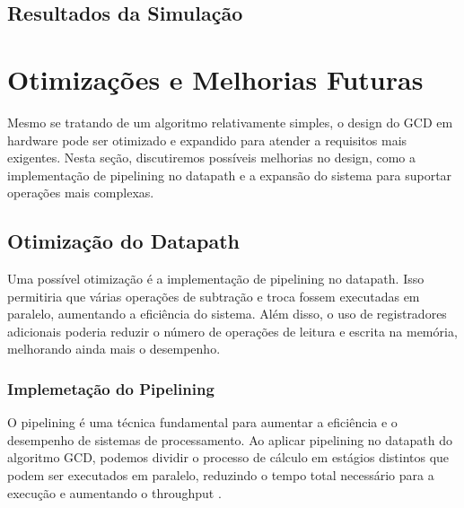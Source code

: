 \documentclass[a4paper,11pt]{article} %
\begin{document}
\subsection{Resultados da Simulação}

\section{Otimizações e Melhorias Futuras}

Mesmo se tratando de um algoritmo relativamente simples, o design do GCD em hardware pode ser otimizado e expandido para atender a requisitos mais exigentes. Nesta seção, discutiremos possíveis melhorias no design, como a implementação de pipelining no datapath e a expansão do sistema para suportar operações mais complexas.




\subsection{Otimização do Datapath}
Uma possível otimização é a implementação de pipelining no datapath. Isso permitiria que várias operações de subtração e troca fossem executadas em paralelo, aumentando a eficiência do sistema. Além disso, o uso de registradores adicionais poderia reduzir o número de operações de leitura e escrita na memória, melhorando ainda mais o desempenho.


\subsubsection{Implemetação do Pipelining}
O pipelining é uma técnica fundamental para aumentar a eficiência e o desempenho de sistemas de processamento. Ao aplicar pipelining no datapath do algoritmo GCD, podemos dividir o processo de cálculo em estágios distintos que podem ser executados em paralelo, reduzindo o tempo total necessário para a execução e aumentando o throughput \cite{Hennessy2017}.
\end{document}
